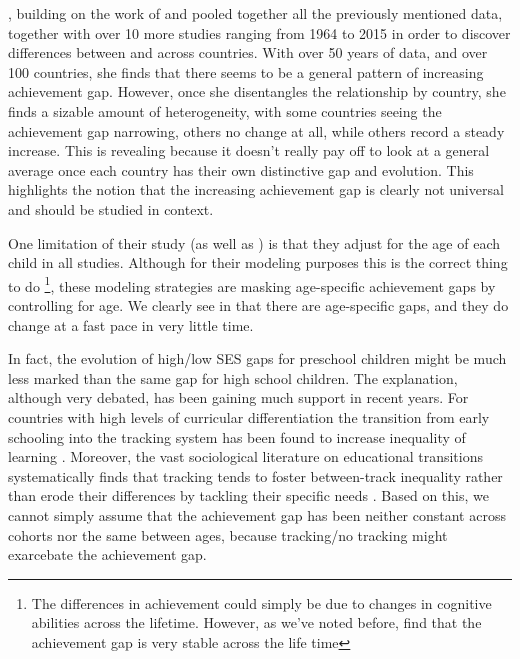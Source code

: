 \documentclass[11pt, a4paper]{article}\usepackage[]{graphicx}\usepackage[]{color}
\begin{document}
\citet{anna2016_global}, building on the work of \citet{anna2016} and \citet{reardon_portilla} pooled together all the previously mentioned data, together with over 10 more studies ranging from 1964 to 2015 in order to discover differences between and across countries. With over 50 years of data, and over 100 countries, she finds that there seems to be a general pattern of increasing achievement gap. However, once she disentangles the relationship by country, she finds a sizable amount of heterogeneity, with some countries seeing the achievement gap narrowing, others no change at all, while others record a steady increase. This is revealing because it doesn't really pay off to look at a general average once each country has their own distinctive gap and evolution. This highlights the notion that the increasing achievement gap is clearly not universal and should be studied in context. 

One limitation of their study (as well as \citet{reardon2011}) is that they adjust for the age of each child in all studies. Although for their modeling purposes this is the correct thing to do \footnote{The differences in achievement could simply be due to changes in cognitive abilities across the lifetime. However, as we've noted before, \citet{bradbury2015} find that the achievement gap is very stable across the life time}, these modeling strategies are masking age-specific achievement gaps by controlling for age. We clearly see in \citet{reardon_portilla} that there are age-specific gaps, and they do change at a fast pace in very little time.

In fact, the evolution of high/low SES gaps for preschool children might be much less marked than the same gap for high school children. The explanation, although very debated, has been gaining much support in recent years. For countries with high levels of curricular differentiation the transition from early schooling into the tracking system has been found to increase inequality of learning \citep{hanushek_woesmann_tracking}. Moreover, the vast sociological literature on educational transitions systematically finds that tracking tends to foster between-track inequality rather than erode their differences by tackling their specific needs \citep{werfhorst_mijs}. Based on this, we cannot simply assume that the achievement gap has been neither constant across cohorts nor the same between ages, because tracking/no tracking might exarcebate the achievement gap.

\end{document}
